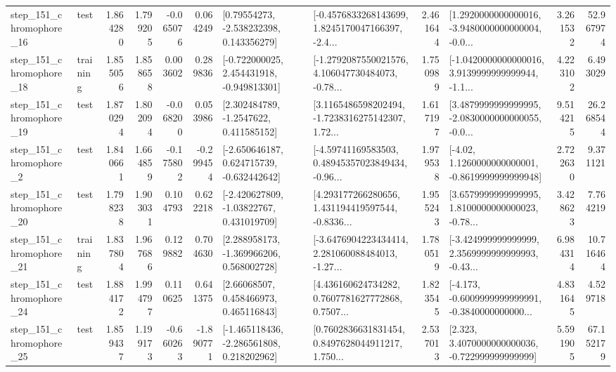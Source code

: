 \begin{tabular}{llrrrrllrlrr}
  step\_151\_chromophore\_16 &      test &      1.864280 &    1.799205 &     -0.065076 &  0.064249 &     [0.79554273, -2.538232398, 0.143356279] &  [-0.4576833268143699, 1.8245170047166397, -2.4... &       2.461644 &  [1.2920000000000016, -3.9480000000000004, -0.0... &            3.261532 &         52.967974 \\
  step\_151\_chromophore\_18 &  training &      1.855056 &    1.858658 &      0.003602 &  0.289836 &   [-0.722000025, 2.454431918, -0.949813301] &  [-1.2792087550021576, 4.106047730484073, -0.78... &       1.750989 &  [-1.0420000000000016, 3.9139999999999944, -1.1... &            4.223102 &          6.493029 \\
  step\_151\_chromophore\_19 &      test &      1.870294 &    1.802094 &     -0.068200 &  0.053986 &      [2.302484789, -1.2547622, 0.411585152] &  [3.1165486598202494, -1.7238316275142307, 1.72... &       1.617197 &  [3.4879999999999995, -2.0830000000000055, -0.0... &            9.514215 &         26.268544 \\
   step\_151\_chromophore\_2 &      test &      1.840661 &    1.664859 &     -0.175802 & -0.299454 &   [-2.650646187, 0.624715739, -0.632442642] &  [-4.59741169583503, 0.48945357023849434, -0.96... &       1.979538 &   [-4.02, 1.1260000000000001, -0.8619999999999948] &            2.722630 &          9.371121 \\
  step\_151\_chromophore\_20 &      test &      1.798238 &    1.903031 &      0.104793 &  0.622218 &    [-2.420627809, -1.03822767, 0.431019709] &  [4.293177266280656, 1.431194419597544, -0.8336... &       1.955243 &  [3.6579999999999995, 1.8100000000000023, -0.78... &            3.428623 &          7.764219 \\
  step\_151\_chromophore\_21 &  training &      1.837804 &    1.967686 &      0.129882 &  0.704630 &    [2.288958173, -1.369966206, 0.568002728] &  [-3.6476904223434414, 2.281060088484013, -1.27... &       1.780519 &  [-3.424999999999999, 2.3569999999999993, -0.43... &            6.984314 &         10.716464 \\
  step\_151\_chromophore\_24 &      test &      1.884172 &    1.994797 &      0.110625 &  0.641375 &      [2.66068507, 0.458466973, 0.465116843] &  [4.436160624734282, 0.7607781627772868, 0.7507... &       1.823545 &  [-4.173, -0.6009999999999991, -0.3840000000000... &            4.831645 &          4.529718 \\
  step\_151\_chromophore\_25 &      test &      1.859437 &    1.199173 &     -0.660263 & -1.890771 &   [-1.465118436, -2.286561808, 0.218202962] &  [0.7602836631831454, 0.8497628044911217, 1.750... &       2.537013 &    [2.323, 3.4070000000000036, -0.722999999999999] &            5.591905 &         67.152179 \\

\end{tabular}

